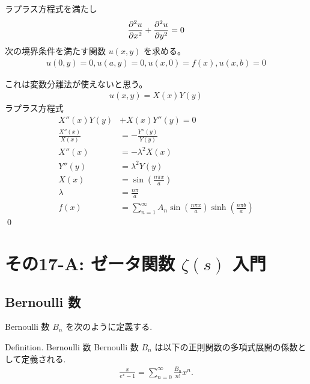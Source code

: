 \documentclass[uplatex,dvipdfmx,a4paper,11pt]{jlreq}
\makeatletter
\theoremstyle{definition}
\renewenvironment{proof}[1][\proofname]{\par
  \normalfont
  \topsep6\p@\@plus6\p@ \trivlist
  \item[\hskip\labelsep{\bfseries #1}\@addpunct{\bfseries}]\ignorespaces\quad\par
}{%
  \qed\endtrivlist\@endpefalse
}
\renewcommand\proofname{証明}
\makeatother
\begin{document}
\begin{proposition}
  ラプラス方程式を満たし
  \begin{align}
    \pdv[2]{u}{x} + \pdv[2]{u}{y} = 0
  \end{align}
  次の境界条件を満たす関数 $u(x, y)$ を求める。
  \begin{align}
    u(0, y) = 0, u(a, y) = 0, u(x, 0) = f(x), u(x, b) = 0
  \end{align}
\end{proposition}
\begin{proof}
  これは変数分離法が使えないと思う。
  \begin{align}
    u(x, y) = X(x)Y(y)
  \end{align}
  ラプラス方程式
  \begin{align}
    X''(x)Y(y)          & + X(x)Y''(y) = 0                                                      \\
    \frac{X''(x)}{X(x)} & = - \frac{Y''(y)}{Y(y)}                                               \\
    X''(x)              & = - \lambda^2X(x)                                                     \\
    Y''(y)              & = \lambda^2Y(y)                                                       \\
    X(x)                & = \sin(\frac{n\pi x}{a})                                              \\
    \lambda             & = \frac{n\pi}{a}                                                      \\
    f(x)                & = \sum_{n=1}^{\infty}A_n\sin(\frac{n\pi x}{a})\sinh(\frac{n\pi b}{a})
  \end{align}
\end{proof}


\section{その17-A: ゼータ関数 $\zeta(s)$ 入門}
\subsection{Bernoulli 数}
Bernoulli 数 $B_n$ を次のように定義する.
\begin{itembox}[l]{Definition. Bernoulli 数}
  Bernoulli 数 $B_n$ は以下の正則関数の多項式展開の係数として定義される.
  \begin{align}
    \frac{x}{e^x - 1} = \sum_{n=0}^{\infty}\frac{B_n}{n!}x^n.
  \end{align}
\end{itembox}
\end{document}
